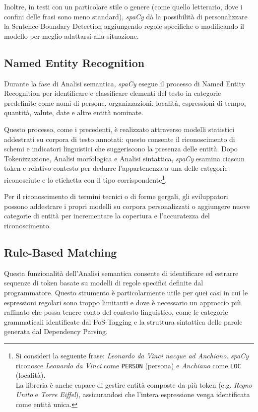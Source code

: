 \documentclass[12pt]{report}
\newcommand{\spacy}{\textsl{spaCy}\xspace}
\begin{document}
Inoltre, in testi con un particolare stile o genere (come quello letterario, dove i confini delle frasi sono meno standard), \spacy dà la possibilità di personalizzare la Sentence Boundary Detection aggiungendo regole specifiche o modificando il modello per meglio adattarsi alla situazione.


\subsection{Named Entity Recognition}
Durante la fase di \textsf{Analisi semantica}, \spacy esegue il processo di Named Entity Recognition per identificare e classificare elementi del testo in categorie predefinite come nomi di persone, organizzazioni, località, espressioni di tempo, quantità, valute, date e altre entità nominate.

Questo processo, come i precedenti, è realizzato attraverso modelli statistici addestrati su corpora di testo annotati: questo consente il riconoscimento di schemi e indicatori linguistici che suggeriscono la presenza delle entità. Dopo \textsf{Tokenizzazione}, \textsf{Analisi morfologica} e \textsf{Analisi sintattica}, \spacy  esamina ciascun token e relativo contesto per dedurre l'appartenenza a una delle categorie riconosciute e lo etichetta con il tipo corrispondente\footnote{Si consideri la seguente frase: \textit{Leonardo da Vinci nacque ad Anchiano}. \spacy riconosce \textit{Leonardo da Vinci} come \texttt{PERSON} (persona) e \textit{Anchiano} come \texttt{LOC} (località).\\
La libreria è anche capace di gestire entità composte da più token (e.g. \textit{Regno Unito} e \textit{Torre Eiffel}), assicurandosi che l'intera espressione venga identificata come entità unica.}.

Per il riconoscimento di termini tecnici o di forme gergali, gli sviluppatori possono addestrare i propri modelli su corpora personalizzati o aggiungere nuove categorie di entità per incrementare la copertura e l’accuratezza del riconoscimento.


\subsection{Rule-Based Matching}
Questa funzionalità dell'\textsf{Analisi semantica} consente di identificare ed estrarre sequenze di token basate su modelli di regole specifici definite dal programmatore. Questo strumento è particolarmente utile per quei casi in cui le espressioni regolari sono troppo limitanti e dove è necessario un approccio più raffinato che possa tenere conto del contesto linguistico, come le categorie grammaticali identificate dal PoS-Tagging e la struttura sintattica delle parole generata dal Dependency Parsing.
\end{document}
